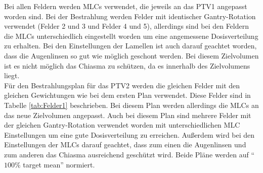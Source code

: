 Bei allen Feldern werden MLCs verwendet, die jeweils an das PTV1 angepasst worden sind.
Bei der Bestrahlung werden Felder mit identischer Gantry-Rotation verwendet (Felder 2 und 3 und Felder 4 und 5), allerdings
sind bei den Feldern die MLCs unterschiedlich eingestellt worden um eine angemessene Dosisverteilung zu erhalten.
Bei den Einstellungen der Lamellen ist auch darauf geachtet worden, dass die Augenlinsen
so gut wie möglich geschont werden. Bei diesem Zielvolumen ist es nicht möglich das Chiasma
zu schützen, da es innerhalb des Zielvolumens liegt. \\
Für den Bestrahlungsplan für das PTV2 werden die gleichen Felder mit den gleichen
Gewichtungen wie bei dem ersten Plan verwendet. Diese Felder sind in Tabelle \ref{tab:Felder1} beschrieben.
Bei diesem Plan werden allerdings die MLCs an das neue Zielvolumen angepasst. Auch bei diesem
Plan sind mehrere Felder mit der gleichen Gantry-Rotation verwendet worden mit unterschiedlichen MLC Einstellungen um
eine gute Dosisverteilung zu erreichen. Außerdem
wird bei den Einstellungen der MLCs darauf geachtet, dass zum einen die Augenlinsen und
zum anderen das Chiasma ausreichend geschützt wird. Beide Pläne werden auf \enquote{$100\%$ target mean} normiert.
